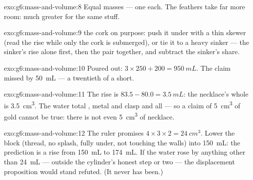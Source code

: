 \begin{solution}{exo:g6:mass-and-volume:8}
Equal masses --- one  each. The feathers take far more
room: much greater  for the same stuff.
\end{solution}

\begin{solution}{exo:g6:mass-and-volume:9}
 the cork on purpose: push it under with a thin skewer (read
the rise while only the cork is submerged), or tie it to a heavy
sinker ---  the sinker's rise alone first, then the pair
together, and subtract the sinker's share.
\end{solution}

\begin{solution}{exo:g6:mass-and-volume:10}
Poured out: $3 \times 250 + 200 = \qty{950}{mL}$. The claim missed
by \qty{50}{mL} --- a twentieth of a  short.
\end{solution}

\begin{solution}{exo:g6:mass-and-volume:11}
The rise is $83.5 - 80.0 = \qty{3.5}{mL}$: the necklace's whole
 is \qty{3.5}{cm^3}. The water  total , metal
and clasp and all --- so a claim of \qty{5}{cm^3} of gold cannot be
true: there is not even \qty{5}{cm^3} of necklace.
\end{solution}

\begin{solution}{exo:g6:mass-and-volume:12}
The ruler promises $4 \times 3 \times 2 = \qty{24}{cm^3}$. Lower
the block (thread, no splash, fully under, not touching the walls)
into \qty{150}{mL}: the prediction is a rise from \qty{150}{mL} to
\qty{174}{mL}. If the water rose by anything other than
\qty{24}{mL} --- outside the cylinder's honest step or two --- the
displacement proposition would stand refuted. (It never has been.)
\end{solution}

